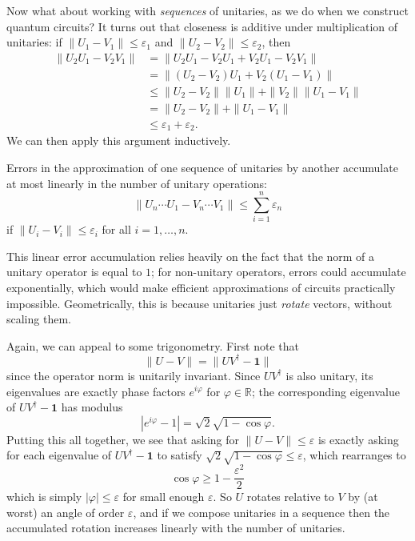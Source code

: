 \documentclass[fleqn,a4paper]{article}
\renewcommand{\footnote}[1]{\sidenotetext[{\color{white}0}\!\!]{\footnotesize #1}}
\newenvironment{idea}{\everypar{\setlength{\parindent}{1.5em}}}{}
\theoremstyle{definition}
\theoremstyle{definition}
\theoremstyle{definition}
\theoremstyle{definition}
\theoremstyle{remark}
\begin{document}
Now what about working with \emph{sequences} of unitaries, as we do when we construct quantum circuits?
It turns out that closeness is additive under multiplication of unitaries: if \(\|U_1-V_1\|\leqslant\varepsilon_1\) and \(\|U_2-V_2\|\leqslant\varepsilon_2\), then
\[
  \begin{aligned}
    \|U_2U_1 - V_2V_1\|
    &= \|U_2U_1 - V_2U_1 + V_2U_1 - V_2V_1\|
  \\&= \|(U_2-V_2)U_1 + V_2(U_1-V_1)\|
  \\&\leqslant\|U_2-V_2\|\|U_1\| + \|V_2\|\|U_1-V_1\|
  \\&= \|U_2-V_2\| + \|U_1-V_1\|
  \\&\leqslant\varepsilon_1+\varepsilon_2.
  \end{aligned}
\]
We can then apply this argument inductively.

\begin{idea}
Errors in the approximation of one sequence of unitaries by another accumulate at most linearly in the number of unitary operations:
\[
  \|U_n\cdots U_1 - V_n\cdots V_1\| \leqslant\sum_{i=1}^n \varepsilon_n
\]
if \(\|U_i-V_i\|\leqslant\varepsilon_i\) for all \(i=1,\ldots,n\).

\end{idea}

This linear error accumulation relies heavily on the fact that the norm of a unitary operator is equal to \(1\); for non-unitary operators, errors could accumulate exponentially, which would make efficient approximations of circuits practically impossible.
Geometrically, this is because unitaries just \emph{rotate} vectors, without scaling them.

Again, we can appeal to some trigonometry.
First note that
\[
  \|U-V\| = \|UV^\dagger-\mathbf{1}\|
\]
since the operator norm is unitarily invariant.\footnote{See Exercise \ref{operator-norm}.}
Since \(UV^\dagger\) is also unitary, its eigenvalues are exactly phase factors \(e^{i\varphi}\) for \(\varphi\in\mathbb{R}\); the corresponding eigenvalue of \(UV^\dagger-\mathbf{1}\) has modulus
\[
  |e^{i\varphi}-1| = \sqrt{2}\sqrt{1-\cos\varphi}.
\]
Putting this all together, we see that asking for \(\|U-V\|\leqslant\varepsilon\) is exactly asking for each eigenvalue of \(UV^\dagger-\mathbf{1}\) to satisfy \(\sqrt{2}\sqrt{1-\cos\varphi}\leqslant\varepsilon\), which rearranges to
\[
  \cos\varphi \geqslant 1-\frac{\varepsilon^2}{2}
\]
which is simply \(|\varphi|\leqslant\varepsilon\) for small enough \(\varepsilon\).
So \(U\) rotates relative to \(V\) by (at worst) an angle of order \(\varepsilon\), and if we compose unitaries in a sequence then the accumulated rotation increases linearly with the number of unitaries.
\end{document}
